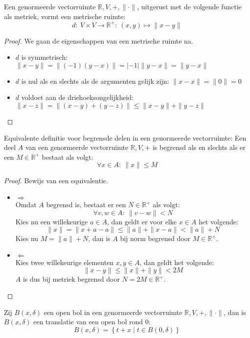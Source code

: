 \documentclass[main.tex]{subfiles}
\begin{document}
\begin{st}
  Een genormeerde vectorruimte $\mathbb{R},V,+,\|\cdot\|$, uitgerust met de volgende functie als metriek, vormt een metrische ruimte:
  \[ d:\ V \times V \rightarrow \mathbb{R}^{+}:\ (x,y) \mapsto \|x-y\| \]

  \begin{proof}
    We gaan de eigenschappen van een metrische ruimte na.
    \begin{itemize}
    \item $d$ is symmetrisch: $\|x-y\| = \|(-1)(y-x)\| = |-1|\|y-x\| = \|y-x\|$
    \item $d$ is nul als en slechts als de argumenten gelijk zijn: $\|x-x\| = \|0\| = 0$
    \item $d$ voldoet aan de driehoeksongelijkheid: $\| x-z \| = \| (x-y)+(y-z) \| \le \|x-y\| + \| y-z \|$
    \end{itemize}
  \end{proof}
\end{st}

\begin{st}
  Equivalente definitie voor begrensde delen in een genormeerde vectorruimte:
  Een deel $A$ van een genormeerde vectorruimte $\mathbb{R},V,+$ is begrensd als en slechts als er een $M \in \mathbb{R}^{+}$ bestaat als volgt:
  \[ \forall x\in A:\ \|x\| \le M \]

  \begin{proof}
    Bewijs van een equivalentie.
    \begin{itemize}
    \item $\Rightarrow$\\
      Omdat $A$ begrensd is, bestaat er een $N\in \mathbb{R}^{+}$ als volgt:
      \[ \forall v,w\in A:\ \|v-w\| < N \]
      Kies nu een willekeurige $a\in A$, dan geldt er voor elke $x\in A$ het volgende:
      \[ \|x\| = \|x+a-a\| \le \|a\| + \|x-a\| < \|a\| + N \]
      Kies nu $M = \|a\|+N$, dan is $A$ bij norm begrensd door $M\in \mathbb{R}^{+}$.
    \item $\Leftarrow$\\
      Kies twee willekeurige elementen $x,y\in A$, dan geldt het volgende:
      \[ \|x-y\| \le \|x\| + \|y\| < 2M \]
      $A$ is dus bij metriek begrensd door $N=2M \in \mathbb{R}^{+}$.
    \end{itemize}
  \end{proof}
\end{st}

\begin{st}
  Zij $B(x,\delta)$ een open bol in een genormeerde vectorruimte $\mathbb{R},V,+,\|\cdot\|$, dan is $B(x,\delta)$ een translatie van een open bol rond $0$:
  \[ B(x,\delta) = \left\{ t+x \mid t \in B(0,\delta) \right\} \]
\end{st}
\end{document}
